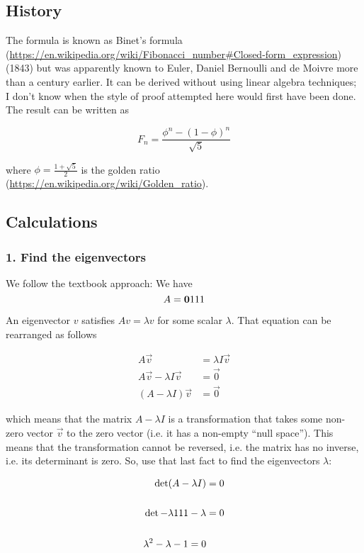 \subsection*{History}

The formula is known as
Binet's formula (\url{https://en.wikipedia.org/wiki/Fibonacci_number#Closed-form_expression})
(1843) but was apparently known to Euler, Daniel Bernoulli and de Moivre more
than a century earlier. It can be derived without using linear algebra
techniques; I don't know when the style of proof attempted here would first
have been done. The result can be written as

$$
F_n = \frac{\phi^n - (1-\phi)^n}{\sqrt{5}}
$$

where $\phi = \frac{1+\sqrt{5}}{2}$ is the
golden ratio (\url{https://en.wikipedia.org/wiki/Golden_ratio}).


\subsection*{Calculations}

\subsubsection{1. Find the eigenvectors}
We follow the textbook approach: We have
$$
A = \mathbf{0}{1}
        {1}{1}
$$

An eigenvector $v$ satisfies $Av = \lambda v$ for some scalar $\lambda$. That
equation can be rearranged as follows

\begin{align*}
A\vec v &= \lambda I\vec v
\\
A\vec v - \lambda I\vec v &= \vec 0
\\
(A - \lambda I)\vec v &= \vec 0
\end{align*}

which means that the matrix $A - \lambda I$ is a transformation that takes some
non-zero vector $\vec v$ to the zero vector (i.e. it has a non-empty ``null
space''). This means that the transformation cannot be reversed, i.e. the matrix
has no inverse, i.e. its determinant is zero. So, use that last fact to find
the eigenvectors $\lambda$:

\begin{align*}
\det (A - \lambda I) &= 0
\\
\\
\det \mathbf{-\lambda}{1}
         {1          }{1 - \lambda} &= 0
\\
\\
\lambda^2 - \lambda - 1 = 0
\end{align*}

